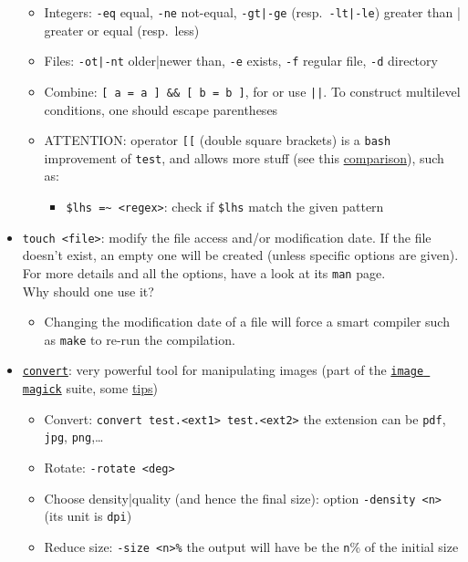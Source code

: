 \documentclass[a4paper,12pt,%
              final%
              ]{article}
\begin{document}
\begin{itemize}
\begin{itemize}
      \item Integers: \verb|-eq| equal, \verb|-ne| not-equal, \verb!-gt|-ge! (resp.~\verb!-lt|-le!) greater than | greater or equal (resp.~less)
      \item Files: \verb!-ot|-nt! older|newer than, \verb|-e| exists, \verb|-f| regular file, \verb|-d| directory
      \item Combine: \verb|[ a = a ] && [ b = b ]|, for or use \verb!||!. To construct multilevel conditions, one should escape parentheses
      \item ATTENTION: operator \verb|[[| (double square brackets) is a \texttt{bash} improvement of \texttt{test}, and allows more stuff (see this \href{https://stackoverflow.com/a/47576482}{comparison}), such as:
        \begin{itemize}
          \item \verb|$lhs =~ <regex>|: check if \verb|$lhs| match the given pattern
        \end{itemize}
    \end{itemize}
  \item \verb|touch <file>|: modify the file access and/or modification date. If the file doesn't exist, an empty one will be created (unless specific options are given). For more details and all the options, have a look at its \texttt{man} page.\\
  Why should one use it?
    \begin{itemize}
      \item Changing the modification date of a file will force a smart compiler such as \verb|make| to re-run the compilation.
    \end{itemize}
  \item \href{http://www.imagemagick.org/script/convert.php}{\texttt{convert}}: very powerful tool for manipulating images (part of the \href{https://imagemagick.org/index.php}{\texttt{image magick}} suite, some \href{http://www.imagemagick.org/script/command-line-processing.php}{tips})
    \begin{itemize}
      \item Convert: \verb|convert test.<ext1> test.<ext2>| the extension can be \texttt{pdf}, \texttt{jpg}, \texttt{png},\ldots
      \item Rotate: \verb|-rotate <deg>|
      \item Choose density|quality (and hence the final size): option \verb|-density <n>| (its unit is \texttt{dpi})
      \item Reduce size: \verb|-size <n>%| the output will have be the \verb|n|\% of the initial size

\end{itemize}
\end{itemize}
\end{document}
